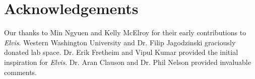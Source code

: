 \documentclass[journal]{IEEEtran} %
\newcommand{\elvis}{\textit{Elvis}}
\begin{document}
\section{Acknowledgements}

Our thanks to Min Ngyuen and Kelly McElroy for their early contributions to \elvis{}. Western Washington University and Dr. Filip Jagodzinski graciously donated lab space.
Dr. Erik Fretheim and Vipul Kumar provided the initial inspiration for \elvis{}.
Dr. Aran Clauson and Dr. Phil Nelson provided invaluable comments.

\end{document}
